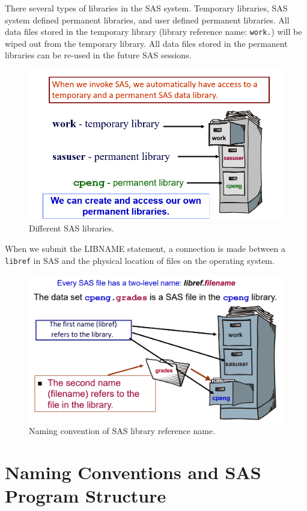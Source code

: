 \documentclass[
]{book}
\begin{document}
There several types of libraries in the SAS system. Temporary libraries, SAS system defined permanent libraries, and user defined permanent libraries. All data files stored in the temporary library (library reference name: \texttt{work.}) will be wiped out from the temporary library. All data files stored in the permanent libraries can be re-used in the future SAS sessions.

\begin{figure}

{\centering \includegraphics[width=0.5\linewidth]{img02/w02-libref02} 

}

\caption{Different SAS libraries.}\label{fig:unnamed-chunk-7}
\end{figure}

When we submit the LIBNAME statement, a connection is made between a \texttt{libref} in SAS and the physical location of files on the operating system.

\begin{figure}

{\centering \includegraphics[width=0.5\linewidth]{img02/w02-libref03} 

}

\caption{Naming convention of SAS library reference name.}\label{fig:unnamed-chunk-8}
\end{figure}

\hypertarget{naming-conventions-and-sas-program-structure}{%
\section{Naming Conventions and SAS Program Structure}\label{naming-conventions-and-sas-program-structure}}
\end{document}
